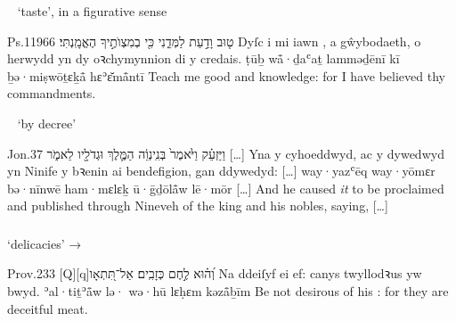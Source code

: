 \begin{frame}{\ex\  ‘taste’, in a figurative sense}
	\begin{example}{Ps.}{119}{66}{}{}
		\quoling
		{ט֤וּב  וָדַ֣עַת לַמְּדֵ֑נִי כִּ֖י בְמִצְוֺתֶ֣יךָ הֶאֱמָֽנְתִּי׃}
		{Dyſc i mi iawn , a gŵybodaeth, o herwydd yn dy oꝛchymynnion di y credais.}
		{ṭūḇ  wå̄·ḏaʿaṯ lamməḏēnī kī ḇə·miṣwōṯɛḵå̄ hɛʾɛ̆må̄ntī}
		{Teach me good  and knowledge: for I have believed thy commandments.}
	\end{example}
\end{frame}



\begin{frame}{\ex\  ‘by decree’}
\begin{example}{Jon.}{3}{7}{}{}
	\quoling
	{וַיַּזְעֵ֗ק וַיֹּ֙אמֶר֙ בְּנִֽינְוֵ֔ה  הַמֶּ֛לֶךְ וּגְדֹלָ֖יו לֵאמֹ֑ר […]}
	{Yna y cyhoeddwyd, ac y dywedwyd yn Ninife  y bꝛenin ai bendefigion, gan ddywedyd: […]}
	{way·yazʿēq way·yōmɛr bə·nīnwē  ham·mɛlɛḵ ū·ḡḏōlå̄w lē·mōr […]}
	{And he caused \textit{it} to be proclaimed and published through Nineveh  of the king and his nobles, saying, […]}
\end{example}
\end{frame}



\subsubsection{}

\begin{frame}{\ex {} ‘delicacies’ → }
	\begin{example}{Prov.}{23}{3}{}{}
		\quoling
		{אַל־תִּ֭תְאָו‪[Q]‬‪[q]‬  וְ֝ה֗וּא לֶ֣חֶם כְּזָבִֽים׃}
		{Na ddeiſyf ei  ef: canys twyllodꝛus yw bwyd.}
		{ʾal·tiṯʾå̄w lə· wə·hū lɛḥɛm kəzå̄ḇīm}
		{Be not desirous of his : for they are deceitful meat.}
	\end{example}
\end{frame}
